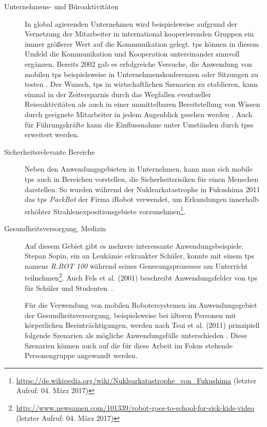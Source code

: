 \begin{description}
\item[Unternehmens- und Büroaktivitäten] In global agierenden Unternehmen wird beispielsweise aufgrund der Vernetzung der Mitarbeiter in \ua international kooperierenden Gruppen ein immer größerer Wert auf die Kommunikation gelegt. \acs{tps} können in diesem Umfeld die Kommunikation und Kooperation untereinander sinnvoll ergänzen. Bereits 2002 gab es erfolgreiche Versuche, die Anwendung von mobilen \acs{tps} beispielsweise in  Unternehmenskonferenzen oder Sitzungen zu testen \cite{Jouppi}. Der Wunsch, \acs{tps} in wirtschaftlichen Szenarien zu etablieren, kann einmal in der Zeitersparnis durch das Wegfallen eventueller Reiseaktivitäten als auch in einer unmittelbaren Bereitstellung von Wissen durch geeignete Mitarbeiter in jedem Augenblick gesehen werden \cite{Jouppi}. Auch für Führungskräfte kann die Einflussnahme unter Umständen durch \aclp{tps} erweitert werden.
\item[Sicherheitsrelevante Bereiche] Neben den Anwendungsgebieten in Unternehmen, kann man sich mobile \acs{tps} auch in Bereichen vorstellen, die Sicherheitsrisiken für einen Menschen darstellen. So wurden während der Nuklearkatastrophe in Fukushima 2011 das \acl{tps} \textit{PackBot} der Firma iRobot verwendet, um Erkundungen innerhalb erhöhter Strahlenexpositionsgebiete vorzunehmen\footnote{\url{https://de.wikipedia.org/wiki/Nuklearkatastrophe_von_Fukushima} (letzter Aufruf: 04. März 2017)}.
\item[Gesundheitsversorgung, Medizin] Auf diesem Gebiet gibt es mehrere interessante Anwendungsbeispiele. Stepan Sopin, ein an Leukämie erkrankter Schüler, konnte mit einem \acs{tps} namens \textit{R.BOT 100} während seines Genesungsprozesses am Unterricht teilnehmen\footnote{\url{http://www.newsamen.com/101339/robot-goes-to-school-for-sick-kids-video} (letzter Aufruf: 04. März 2017)}. Auch Fels et al. (2001) beschreibt Anwendungsfelder von \acs{tps} für Schüler und Studenten~\cite{Fels2001}. 


Für die Verwendung von mobilen Robotersystemen im Anwendungsgebiet der Gesundheitsversorgung, beispielsweise bei älteren Personen mit körperlichen Beeinträchtigungen, werden nach Tsui et al. (2011) prinzipiell folgende Szenarien als mögliche Anwendungsfälle unterschieden \cite{tsui2011}. Diese Szenarien können auch auf die für diese Arbeit im Fokus stehende Personengruppe angewandt werden.


\end{description}
